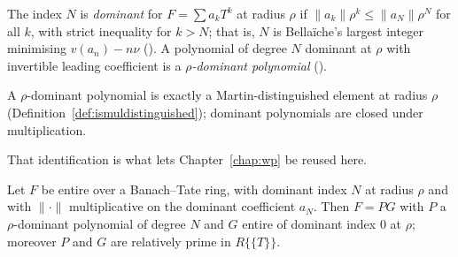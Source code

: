 \begin{definition}
  \label{def:dominant-index}
  \leanok
  The index $N$ is \emph{dominant} for $F = \sum a_k T^k$ at radius $\rho$ if
  $\lVert a_k\rVert\rho^k \leq \lVert a_N\rVert\rho^N$ for all $k$, with strict inequality for
  $k > N$; that is, $N$ is Bella\"iche's largest integer minimising $v(a_n) - n\nu$
  (\cite[Definition II.2.3]{Bellaiche}).  A polynomial of degree $N$ dominant at $\rho$ with
  invertible leading coefficient is a \emph{$\rho$-dominant polynomial}
  (\cite[Definition II.2.4]{Bellaiche}).
\end{definition}

\begin{lemma}
  \label{lem:dominant-distinguished}
  \leanok
  A $\rho$-dominant polynomial is exactly a Martin-distinguished element at radius $\rho$
  (Definition~\ref{def:ismuldistinguished}); dominant polynomials are closed under
  multiplication.
\end{lemma}

That identification is what lets Chapter~\ref{chap:wp} be reused here.

\begin{theorem}
  \label{thm:slope-factorisation}
  \leanok
  Let $F$ be entire over a Banach--Tate ring, with dominant index $N$ at radius $\rho$ and with
  $\lVert\cdot\rVert$ multiplicative on the dominant coefficient $a_N$.  Then $F = PG$ with $P$
  a $\rho$-dominant polynomial of degree $N$ and $G$ entire of dominant index $0$ at $\rho$;
  moreover $P$ and $G$ are relatively prime in $R\{\{T\}\}$.
\end{theorem}

